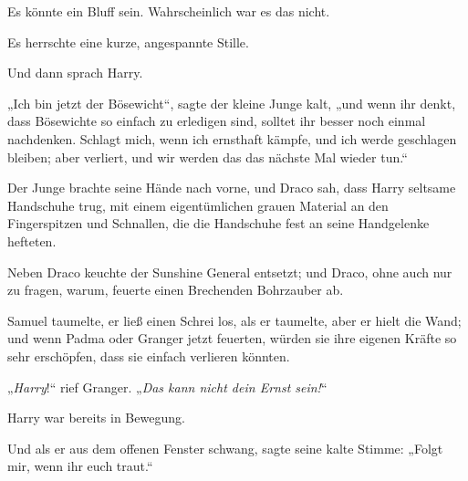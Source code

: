 Es könnte ein Bluff sein. Wahrscheinlich war es das nicht.

Es herrschte eine kurze, angespannte Stille.

Und dann sprach Harry.

„Ich bin jetzt der Bösewicht“, sagte der kleine Junge kalt, „und wenn ihr denkt, dass Bösewichte so einfach zu erledigen sind, solltet ihr besser noch einmal nachdenken. Schlagt mich, wenn ich ernsthaft kämpfe, und ich werde geschlagen bleiben; aber verliert, und wir werden das das nächste Mal wieder tun.“

Der Junge brachte seine Hände nach vorne, und Draco sah, dass Harry seltsame Handschuhe trug, mit einem eigentümlichen grauen Material an den Fingerspitzen und Schnallen, die die Handschuhe fest an seine Handgelenke hefteten.

Neben Draco keuchte der Sunshine General entsetzt; und Draco, ohne auch nur zu fragen, warum, feuerte einen Brechenden Bohrzauber ab.

Samuel taumelte, er ließ einen Schrei los, als er taumelte, aber er hielt die Wand; und wenn Padma oder Granger jetzt feuerten, würden sie ihre eigenen Kräfte so sehr erschöpfen, dass sie einfach verlieren könnten.

„\emph{Harry}!“ rief Granger. „\emph{Das kann nicht dein Ernst sein!}“

Harry war bereits in Bewegung.

Und als er aus dem offenen Fenster schwang, sagte seine kalte Stimme: „Folgt mir, wenn ihr euch traut.“

